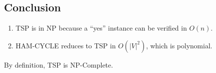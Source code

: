 \documentclass[12pt]{article}
\begin{document}
\subsection*{Conclusion}

\begin{enumerate}
    \item TSP is in NP because a ``yes'' instance can be verified in \(O(n)\).
    \item HAM-CYCLE reduces to TSP in \(O(|V|^2)\), which is polynomial.
\end{enumerate}

By definition, TSP is NP-Complete.
\end{document}
